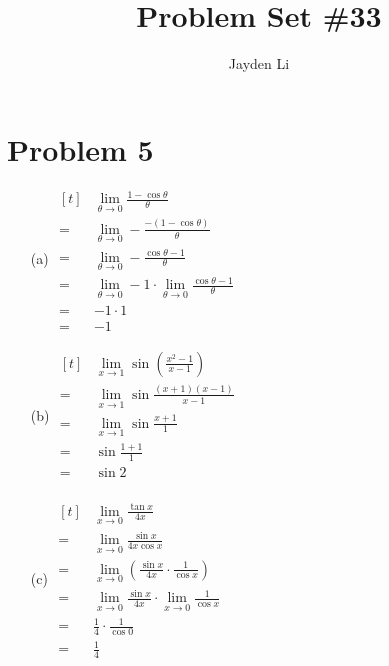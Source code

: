 \documentclass{article}
\title{Problem Set \#33}
\author{Jayden Li}
\begin{document}
\maketitle

\fontsize{12pt}{12pt}\selectfont

\section*{Problem 5}

\begin{multicols}{2}
\begin{itemize}

\item[(a)]
$\begin{aligned}[t]
	&\lim\limits_{\theta\to0}\frac{1-\cos\theta}{\theta} \\
	=&\lim\limits_{\theta\to0}-\frac{-\left(1-\cos\theta\right)}{\theta} \\
	=&\lim\limits_{\theta\to0}-\frac{\cos\theta-1}{\theta} \\
	=&\lim\limits_{\theta\to0}-1\cdot\lim\limits_{\theta\to0}\frac{\cos\theta-1}{\theta} \\
	=&-1\cdot1 \\
	=&\boxed{-1}
\end{aligned}$

\item[(b)] 
$\begin{aligned}[t]
	&\lim\limits_{x\to1}\sin\left(\frac{x^2-1}{x-1}\right) \\
	=&\lim\limits_{x\to1}\sin\frac{\left(x+1\right)\left(x-1\right)}{x-1} \\
	=&\lim\limits_{x\to1}\sin\frac{x+1}{1} \\
	=&\sin\frac{1+1}{1} \\
	=&\boxed{\sin2} \\
\end{aligned}$

\item[(c)] 
$\begin{aligned}[t]
	&\lim\limits_{x\to0}\frac{\tan x}{4x} \\
	=&\lim\limits_{x\to0}\frac{\sin x}{4x\cos x} \\
	=&\lim\limits_{x\to0}\left(\frac{\sin x}{4x}\cdot\frac{1}{\cos x}\right) \\
	=&\lim\limits_{x\to0}\frac{\sin x}{4x}\cdot\lim\limits_{x\to0}\frac{1}{\cos x} \\
	=&\frac{1}{4}\cdot\frac{1}{\cos0} \\
	=&\boxed{\frac{1}{4}}
\end{aligned}$


\end{itemize}
\end{multicols}
\end{document}
